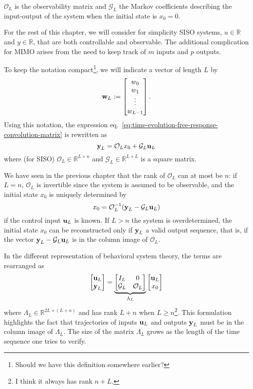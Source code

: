 $\mathcal{O}_L$ is the observability matrix and $\mathcal{G}_L$ the Markov coefficients describing the input-output of the system when the initial state is $x_0=0$.

For the rest of this chapter, we will consider for simplicity SISO systems, $u\in \mathbb{R}$ and $y\in \mathbb{R}$, that are both controllable and observable. The additional complication for MIMO arises from the need to keep track of $m$ inputs and $p$ outputs.

To keep the notation compact\footnote{Should we have this definition somewhere earlier?}, we will indicate a vector of length $L$ by
\begin{equation*}
  \boldsymbol{\mathrm{w}}_L :=
  \begin{bmatrix}
    w_0 \\ w_1 \\ \vdots \\ w_{L-1}
  \end{bmatrix}.
\end{equation*}
Using this notation, the expression eq.~\eqref{eq:time-evolution-free-response-convolution-matrix} is rewritten as
\begin{equation*}
  \boldsymbol{\mathrm{y}}_L = \mathcal{O}_Lx_0 + \mathcal{G}_L\boldsymbol{\mathrm{u}}_L
\end{equation*}
where (for SISO) $\mathcal{O}_L\in\mathbb{R}^{L\times n}$ and $\mathcal{G}_L\in \mathbb{R}^{L\times L}$ is a square matrix.

We have seen in the previous chapter that the rank of $\mathcal{O}_L$ can at most be $n$: if $L=n$, $\mathcal{O}_L$ is invertible since the system is assumed to be observable, and the initial state $x_0$ is uniquely determined by
\begin{equation*}
  x_0 = \mathcal{O}_L^{-1}(\boldsymbol{\mathrm{y}}_L - \mathcal{G}_L\boldsymbol{\mathrm{u}}_L)
\end{equation*}
if the control input $\boldsymbol{\mathrm{u}}_L$ is known. If $L>n$ the system is overdetermined, the initial state $x_0$ can be reconstructed only if $\boldsymbol{\mathrm{y}}_L$ a valid output sequence, that is, if the vector $\boldsymbol{\mathrm{y}}_L - \mathcal{G}_L\boldsymbol{\mathrm{u}}_L$ is in the column image of $\mathcal{O}_L$.

In the different representation of behavioral system theory, the terms are rearranged as
\begin{equation*}
  \begin{bmatrix}
    \boldsymbol{\mathrm{u}}_L \\ \boldsymbol{\mathrm{y}}_L
  \end{bmatrix} = \underbrace{
  \begin{bmatrix}
    I_L & 0 \\ \mathcal{G}_L & \mathcal{O}_L
  \end{bmatrix}}_{\Lambda_L}
\begin{bmatrix}
  \boldsymbol{\mathrm{u}}_L \\ x_0
\end{bmatrix}
\end{equation*}
where $\Lambda_L\in \mathbb{R}^{2L\times(L+n)}$ and has rank $L+n$ when $L\ge n$\footnote{I think it always has rank $n+L$.}. This formulation highlights the fact that trajectories of inputs $\boldsymbol{\mathrm{u}}_L$ and outputs $\boldsymbol{\mathrm{y}}_L$ must be in the column image of $\Lambda_L$. The size of the matrix $\Lambda_L$ grows as the length of the time sequence one tries to verify.

